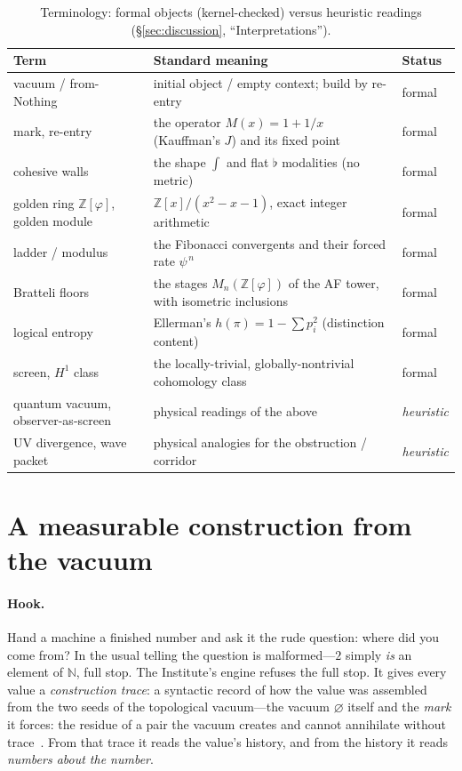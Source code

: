 \documentclass[11pt,letterpaper]{article}
\theoremstyle{plain}
\theoremstyle{definition}
\theoremstyle{remark}
\newcommand{\NN}{\mathbb{N}}
\newcommand{\ZZ}{\mathbb{Z}}
\newcommand{\Zphi}{\ZZ[\varphi]}
\begin{document}
\begin{table}[h]
\centering
\small
\begin{tabular}{@{}lll@{}}
\toprule
Term & Standard meaning & Status \\
\midrule
vacuum / from-Nothing & initial object / empty context; build by re-entry & formal \\
mark, re-entry & the operator $M(x)=1+1/x$ (Kauffman's $J$) and its fixed point & formal \\
cohesive walls & the shape $\int$ and flat $\flat$ modalities (no metric) & formal \\
golden ring $\Zphi$, golden module & $\mathbb{Z}[x]/(x^2-x-1)$, exact integer arithmetic & formal \\
ladder / modulus & the Fibonacci convergents and their forced rate $\psi^{\,n}$ & formal \\
Bratteli floors & the stages $M_n(\Zphi)$ of the AF tower, with isometric inclusions & formal \\
logical entropy & Ellerman's $h(\pi)=1-\sum p_i^2$ (distinction content) & formal \\
screen, $H^1$ class & the locally-trivial, globally-nontrivial cohomology class & formal \\
quantum vacuum, observer-as-screen & physical readings of the above & \emph{heuristic} \\
UV divergence, wave packet & physical analogies for the obstruction / corridor & \emph{heuristic} \\
\bottomrule
\end{tabular}
\caption{Terminology: formal objects (kernel-checked) versus heuristic readings
(\S\ref{sec:discussion}, ``Interpretations'').}
\label{tab:glossary}
\end{table}

\section{A measurable construction from the vacuum}\label{sec:engine}

\paragraph{Hook.}
Hand a machine a finished number and ask it the rude question: where did you come
from? In the usual telling the question is malformed---$2$ simply \emph{is} an
element of $\NN$, full stop. The Institute's engine refuses the full stop. It
gives every value a \emph{construction trace}: a syntactic record of how the value
was assembled from the two seeds of the topological vacuum---the vacuum $\varnothing$
itself and the \emph{mark} it forces: the residue of a pair the vacuum creates and
cannot annihilate without trace~\citep{iaom_quantum_atlas,kock2004}. From that trace
it reads the value's history, and from the history it reads \emph{numbers about the
number}.
\end{document}
